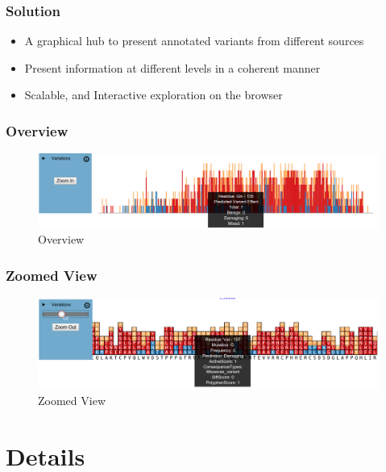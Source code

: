 \documentclass[10pt, compress]{beamer}
\renewcommand{\(}{\begin{columns}}
\renewcommand{\)}{\end{columns}}
\newcommand{\<}[1]{\begin{column}{#1}}
\renewcommand{\>}{\end{column}}
\begin{document}
\begin{frame}[fragile]
\frametitle{Solution}

  \begin{itemize}[<+- | alert@+>]
    \item A graphical hub to present annotated variants from different sources
   	\item Present information at different levels in a coherent manner
   	\item Scalable,  and Interactive exploration on the browser
   	
  \end{itemize}
\end{frame}

\begin{frame}
\frametitle{Overview}
\begin{figure}
\includegraphics[width=\linewidth]{images/overview}
\caption{Overview}
\end{figure}
\end{frame}

\begin{frame}
\frametitle{Zoomed View}
\begin{figure}
\includegraphics[width=\linewidth]{images/zoomed_view}
\caption{Zoomed View}
\end{figure}
\end{frame}




\section{Details}
\end{document}
